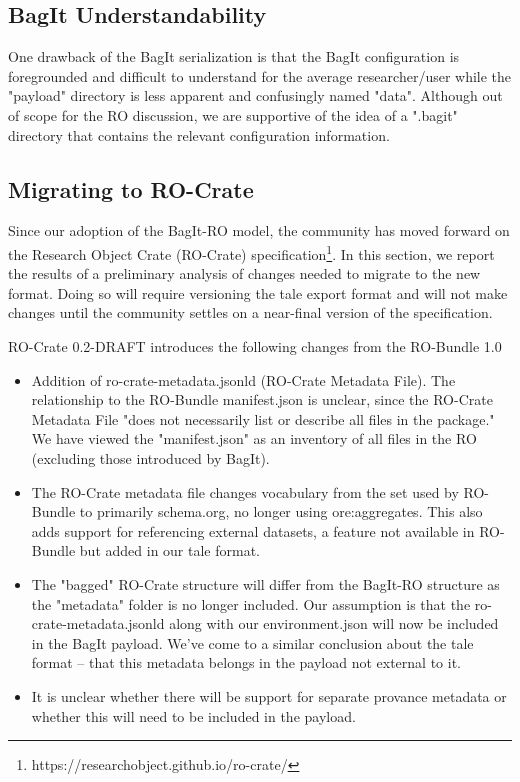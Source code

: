\documentclass[conference]{IEEEtran}
\begin{document}
\subsection{BagIt Understandability}

One drawback of the BagIt serialization is that the BagIt configuration is foregrounded and 
difficult to understand for the average researcher/user while the "payload" directory is less 
apparent and confusingly named "data". Although out of scope for the RO discussion, we are 
supportive of the idea of a ".bagit" directory that contains the relevant configuration 
information.





\subsection{Migrating to RO-Crate}
Since our adoption of the BagIt-RO model, the community has moved forward on the Research Object 
Crate (RO-Crate) specification\footnote{https://researchobject.github.io/ro-crate/}. In this section, we report the results of a preliminary analysis 
of changes needed to migrate to the new format.  Doing so will require versioning the tale export 
format and will not make changes until the community settles on a near-final version of the 
specification.

RO-Crate 0.2-DRAFT introduces the following changes from the RO-Bundle 1.0
\begin{itemize}
\item{Addition of ro-crate-metadata.jsonld (RO-Crate Metadata File). The relationship to the RO-Bundle manifest.json is unclear, since the RO-Crate Metadata File "does not necessarily list or describe all files in the package." We have viewed the "manifest.json" as an inventory of all files in the RO (excluding those introduced by BagIt).}
\item{The RO-Crate metadata file changes vocabulary from the set used by RO-Bundle to primarily schema.org, no longer using ore:aggregates. This also adds support for referencing external datasets, a feature not available in RO-Bundle but added in our tale format.}
\item{The "bagged" RO-Crate structure will differ from the BagIt-RO structure as the "metadata" folder is no longer included.  Our assumption is that the ro-crate-metadata.jsonld along with our environment.json will now be included in the BagIt payload. We've come to a similar conclusion about the tale format -- that this metadata belongs in the payload not external to it.}
\item{It is unclear whether there will be support for separate provance metadata or whether this will need to be included in the payload.}
\end{itemize}
\end{document}
